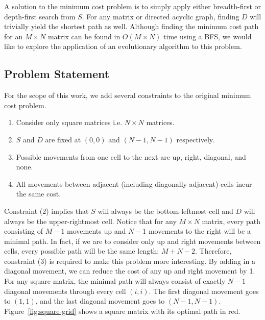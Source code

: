 A solution to the minimum cost problem is to simply apply either breadth-first or depth-first search from $S$. For any matrix or directed acyclic graph, finding $D$ will trivially yield the shortest path as well. Although finding the minimum cost path for an $M \times N$ matrix can be found in $O(M \times N)$ time using a BFS, we would like to explore the application of an evolutionary algorithm to this problem.

\subsection{Problem Statement}

 For the scope of this work, we add several constraints to the original minimum cost problem.
\begin{enumerate}
    \item Consider only square matrices i.e. $N \times N$ matrices.
    \item $S$ and $D$ are fixed at $(0, 0)$ and $(N-1, N-1)$ respectively. \label{two}
    \item Possible movements from one cell to the next are up, right, diagonal, and none.
    \item All movements between adjacent (including diagonally adjacent) cells incur the same cost.
\end{enumerate}

Constraint (2) implies that $S$ will always be the bottom-leftmost cell and $D$ will always be the upper-rightmost cell. Notice that for any $M \times N$ matrix, every path consisting of $M-1$ movements up and $N-1$ movements to the right will be a minimal path. In fact, if we are to consider only up and right movements between cells, every possible path will be the same length: $M + N - 2$. Therefore, constraint (3) is required to make this problem more interesting. By adding in a diagonal movement, we can reduce the cost of any up and right movement by 1. For any square matrix, the minimal path will always consist of exactly $N-1$ diagonal movements through every cell $(i, i)$. The first diagonal movement goes to $(1,1)$, and the last diagonal movement goes to $(N-1, N-1)$. Figure~\ref{fig:square-grid} shows a square matrix with its optimal path in red.

